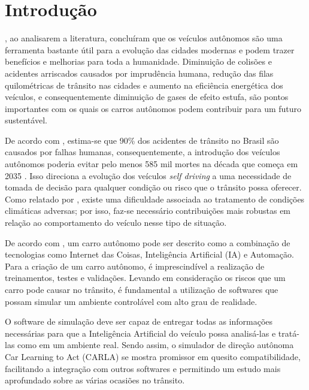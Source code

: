\documentclass[a4paper,12pt,Times]{article}
\begin{document}
 \onehalfspace  %
 \setlength{\parindent}{1.25cm}


\section{Introdução}

, ao analisarem a literatura, concluíram que os veículos autônomos são uma ferramenta bastante útil para a evolução das cidades modernas e podem trazer benefícios e melhorias para toda a humanidade. Diminuição de colisões e  acidentes arriscados causados por imprudência humana, redução das filas quilométricas de trânsito nas cidades e aumento na eficiência energética dos veículos, e consequentemente diminuição de gases de efeito estufa, são pontos importantes com os quais os carros autônomos podem contribuir para um futuro sustentável.  

De acordo com , estima-se que 90\% dos acidentes de trânsito no Brasil são causados por falhas humanas, consequentemente, a introdução dos veículos autônomos poderia evitar pelo menos 585 mil mortes na década que começa em 2035 \cite{redmon2018yolov3}. Isso direciona a evolução dos veículos \textit{self driving} a uma necessidade de tomada de decisão para qualquer condição ou risco que o trânsito possa oferecer. Como relatado por , existe uma dificuldade associada ao tratamento de condições climáticas adversas; por isso, faz-se necessário contribuições mais robustas em relação ao comportamento do veículo nesse tipo de situação.

De acordo com , um carro autônomo pode ser descrito como a combinação de tecnologias como Internet das Coisas, Inteligência Artificial (IA) e Automação. Para a criação de um carro autônomo, é imprescindível a realização de treinamentos, testes e validações. Levando em consideração os riscos que um carro pode causar no trânsito, é fundamental a utilização de softwares que possam simular um ambiente controlável com alto grau de realidade.

O software de simulação deve ser capaz de entregar todas as informações necessárias para que a Inteligência Artificial do veículo possa analisá-las e tratá-las como em um ambiente real. Sendo assim, o simulador de direção autônoma Car Learning to Act (CARLA) \cite{Dosovitskiy17} se mostra promissor em quesito compatibilidade, facilitando a integração com outros softwares e permitindo um estudo mais aprofundado sobre as várias ocasiões no trânsito.
\end{document}
